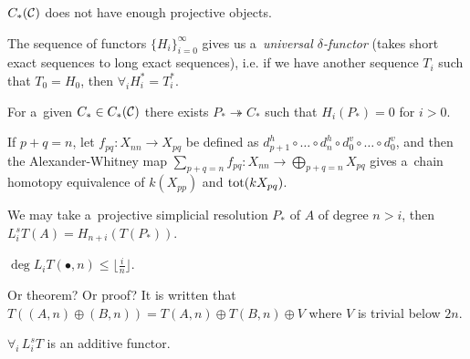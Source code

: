 



    \begin{remark}
        $C_\ast(\mathcal{C})$ does not have enough projective objects.
    \end{remark}
    
    \begin{theorem}
        The sequence of functors $\{ H_i\}_{i=0}^\infty$
        gives us a~{\em universal $\delta$-functor}
        (takes short exact sequences to long exact sequences),
        i.e. if we have another sequence $T_i$ such that
        ${T_0 = H_0}$, then $\forall_i H_i^\ast= T_i^\ast$.
    \end{theorem}
    
    \begin{lemma}
        For a~given $C_\ast \in C_\ast(\mathcal{C})$ there exists 
        $P_\ast \twoheadrightarrow C_\ast$
        such that $H_i(P_\ast) = 0$ for $i>0$.
    \end{lemma}
    
    \begin{remark}
        If $p+q=n$,
        let $f_{pq}:X_{nn}\to X_{pq}$ be
        defined as $d_{p+1}^h \circ \ldots \circ d_n^h
        \circ d_0^v \circ \ldots \circ d_0^v$,
        and then the Alexander-Whitney map
        $\sum_{p+q = n}f_{pq}:X_{nn} \to \bigoplus_{p+q=n}X_{pq}$
        gives a~chain homotopy equivalence 
        of $k(X_{pp})$ and ${\mathrm{tot}}(kX_{pq})$.
    \end{remark}
    
    \begin{remark}
        We may take a~projective simplicial resolution $P_\ast$ of $A$
        of degree $n>i$,
        then $L_i^s T(A) = H_{n+i}(T(P_\ast))$.
    \end{remark}
    
    \begin{theorem}
        $\deg L_i T(\bullet, n) \leq \lfloor \frac i n \rfloor$.
    \end{theorem}
    
    \begin{remark}
        Or theorem? Or proof?
        It is written that 
        \\ $T((A,n)\oplus(B,n)) = T(A,n) \oplus T(B,n) \oplus V$
        where $V$ is trivial below $2n$.
    \end{remark}
    
    \begin{proposition}
        $\forall_i \, L_i^sT$ is an additive functor.
    \end{proposition}
    
